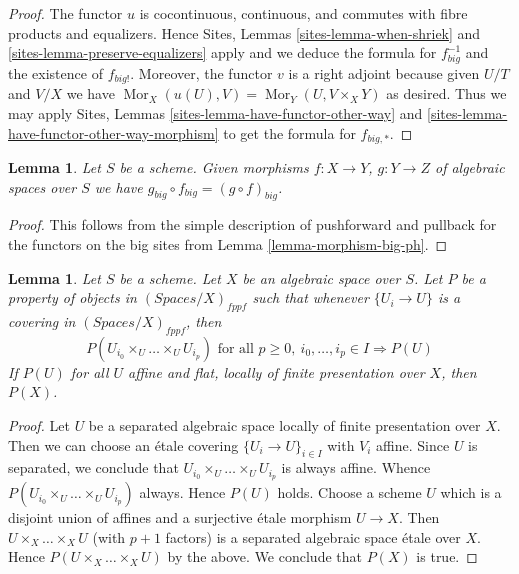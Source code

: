 \documentclass{stacks-project}
\theoremstyle{plain}
\newtheorem{lemma}[subsection]{Lemma}
\theoremstyle{definition}
\theoremstyle{remark}
\numberwithin{equation}{subsection}
\def\Mor{\mathop{\mathrm{Mor}}\nolimits}
\begin{document}
\begin{proof}
The functor $u$ is cocontinuous, continuous, and commutes with fibre products
and equalizers. Hence
Sites, Lemmas \ref{sites-lemma-when-shriek} and
\ref{sites-lemma-preserve-equalizers}
apply and we deduce the formula
for $f_{big}^{-1}$ and the existence of $f_{big!}$. Moreover,
the functor $v$ is a right adjoint because given $U/T$ and $V/X$
we have $\Mor_X(u(U), V) = \Mor_Y(U, V \times_X Y)$
as desired. Thus we may apply
Sites, Lemmas \ref{sites-lemma-have-functor-other-way} and
\ref{sites-lemma-have-functor-other-way-morphism} to get the
formula for $f_{big, *}$.
\end{proof}

\begin{lemma}
\label{lemma-composition-ph}
Let $S$ be a scheme. Given morphisms $f : X \to Y$, $g : Y \to Z$
of algebraic spaces over $S$ we have
$g_{big} \circ f_{big} = (g \circ f)_{big}$.
\end{lemma}

\begin{proof}
This follows from the simple description of pushforward
and pullback for the functors on the big sites from
Lemma \ref{lemma-morphism-big-ph}.
\end{proof}

\begin{lemma}
\label{lemma-cech-enough}
Let $S$ be a scheme. Let $X$ be an algebraic space over $S$.
Let $P$ be a property of objects in $(\textit{Spaces}/X)_{fppf}$
such that whenever $\{U_i \to U\}$ is a covering in
$(\textit{Spaces}/X)_{fppf}$, then
$$
P(U_{i_0} \times_U \ldots \times_U U_{i_p})
\text{ for all }
p \geq 0,\ i_0, \ldots, i_p \in I
\Rightarrow P(U)
$$
If $P(U)$ for all $U$ affine and flat, locally of finite presentation over $X$,
then $P(X)$.
\end{lemma}

\begin{proof}
Let $U$ be a separated algebraic space locally of finite presentation over $X$.
Then we can choose an \'etale covering $\{U_i \to U\}_{i \in I}$ with $V_i$
affine. Since $U$ is separated, we conclude that
$U_{i_0} \times_U \ldots \times_U U_{i_p}$ is always affine.
Whence $P(U_{i_0} \times_U \ldots \times_U U_{i_p})$ always.
Hence $P(U)$ holds. Choose a scheme $U$ which is a disjoint union of
affines and a surjective \'etale morphism $U \to X$.
Then $U \times_X \ldots \times_X U$ (with $p + 1$ factors)
is a separated algebraic space
\'etale over $X$. Hence $P(U \times_X \ldots \times_X U)$ by the above.
We conclude that $P(X)$ is true.
\end{proof}
\end{document}
